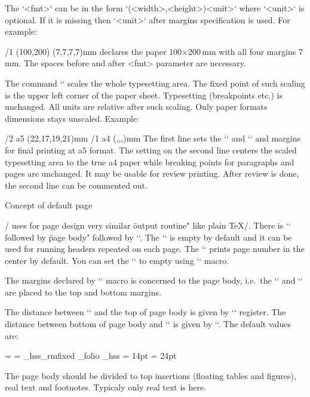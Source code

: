 The `<fmt>` can be in the form `(<width>,<height>)<unit>` where `<unit>` is
optional. If it is missing then `<unit>` after margins specification is
used. For example:

\begtt
\margins/1 (100,200) (7,7,7,7)mm
\endtt
%
declares the paper 100$\times$200\,mm with all four margins 7\,mm. The spaces
before and after <fmt> parameter are necessary.

The command `\magscale[<factor>]` scales the whole typesetting area. 
\new The fixed point of such scaling is the upper left corner of the paper sheet. 
Typesetting (breakpoints etc.) is unchanged. All units are relative after
such scaling. Only paper formats dimensions stays unscaled. Example:

\begtt
\margins/2 a5 (22,17,19,21)mm
\magscale[1414] \margins/1 a4 (,,,)mm
\endtt
%
The first line sets the `\hsize` and `\vsize` and margins for final
printing at a5 format. The setting on the second line centers the scaled 
typesetting area to the true a4 paper while breaking points for paragraphs
and pages are unchanged. It may be usable for 
review printing. After review is done, the second line can be commented out.

\secc Concept of default page

\OpTeX/ uses for page design very similar \"output routine" like plain
\TeX/. There is `\headline` followed by \"page body" followed by
`\footline`. The `\headline` is empty by default and it can be used
for running headers repeated on each page. The `\footline` prints
page number in the center by default. You can set the `\footline` to empty
using `\nopagenumbers` macro.

The margins declared by `\margins` macro is concerned to the page body,
i.e.\ the `\headline` and `\fooline` are placed to the top and bottom
margins.

The distance between `\headline` and the top of page body is given by
`\hedalinedist` register. The distance between bottom of page body and `\footline` is
given by `\footlinedist`. The default values are:

\begtt
\headline = {}
\footline = {\_hss\_rmfixed \_folio \_hss} %
\headlinedist = 14pt %
\footlinedist = 24pt %
\endtt

The page body should be divided to top insertions (floating tables and
figures), real text and footnotes. Typicaly only real text is here. 

